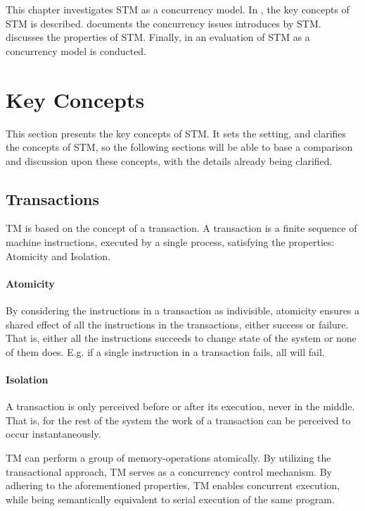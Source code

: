 \makeatletter {}\makeatother
{}
This chapter investigates \ac{STM} as a concurrency model. In , the key concepts of \ac{STM} is described.  documents the concurrency issues introduces by \ac{STM}.  discusses the properties of \ac{STM}. Finally, in  an evaluation of \ac{STM} as a concurrency model is conducted.

\section{Key Concepts}
\label{sec:stm_keyconcepts}
This section presents the key concepts of \ac{STM}. It sets the setting, and clarifies the concepts of \ac{STM}, so the following sections will be able to base a comparison and discussion upon these concepts, with the details already being clarified.

\subsection{Transactions}
\ac{TM} is based on the concept of a transaction. A transaction is a finite sequence of machine instructions, executed by a single process, satisfying the properties: Atomicity and Isolation\cite[p. 2]{herlihy2011tm}.

\paragraph{Atomicity} By considering the instructions in a transaction as indivisible, atomicity ensures a shared effect of all the instructions in the transactions, either success or failure. That is, either all the instructions succeeds to change state of the system or none of them does. E.g. if a single instruction in a transaction fails, all will fail.
\paragraph{Isolation} A transaction is only perceived before or after its execution, never in the middle. That is, for the rest of the system the work of a transaction can be perceived to occur instantaneously. 

\ac{TM} can perform a group of memory-operations atomically\cite[48]{harris2005composable}. By utilizing the transactional approach, \ac{TM} serves as a concurrency control mechanism. By adhering to the aforementioned properties, \ac{TM} enables concurrent execution, while being semantically equivalent to serial execution of the same program.

